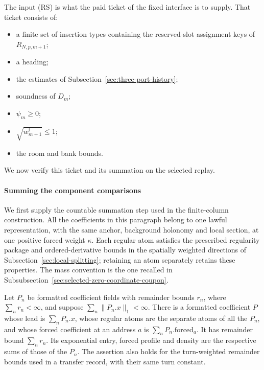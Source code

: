 The input (RS) is what the paid ticket of the fixed interface is to supply.
That ticket consists of:
\begin{itemize}
\item a finite set of insertion types containing the reserved-slot assignment keys of $R_{N,p,m+1}$;
\item a heading;
\item the estimates of Subsection~\ref{sec:three-port-history};
\item soundness of $D_m$;
\item $\psi_m\ge0$;
\item $\sqrt{w^{\mathrm f}_{m+1}}\le1$;
\item the room and bank bounds.
\end{itemize}
We now verify this ticket and its summation on the selected replay.

\paragraph{Summing the component comparisons}
\label{sec:selected-coupon-merger}

We first supply the countable summation step used in the finite-column
construction. All the coefficients in this paragraph belong to one
lawful representation, with the same anchor, background holonomy
and local section, at one positive forced weight $\kappa$.
Each regular atom satisfies the prescribed regularity package and
ordered-derivative bounds in the spatially weighted directions of
Subsection~\ref{sec:local-splitting}; retaining an atom separately
retains these properties. The mass convention is
the one recalled in Subsubsection~\ref{sec:selected-zero-coordinate-coupon}.

\begin{lemma}
\label{lem:selected-coefficient-merger}
Let $P_n$ be formatted coefficient fields with remainder bounds $r_n$,
where $\sum_n r_n<\infty$, and suppose
$\sum_n\|P_n.x\|_1<\infty$. There is a formatted coefficient $P$
whose lead is $\sum_nP_n.x$, whose regular atoms are the separate
atoms of all the $P_n$, and whose forced coefficient at an address
$a$ is $\sum_n P_n.\mathrm{forced}_a$. It has remainder bound
$\sum_n r_n$. Its exponential entry, forced profile and density are
the respective sums of those of the $P_n$. The assertion also holds
for the turn-weighted remainder bounds used in a transfer record, with their
same turn constant.
\end{lemma}

